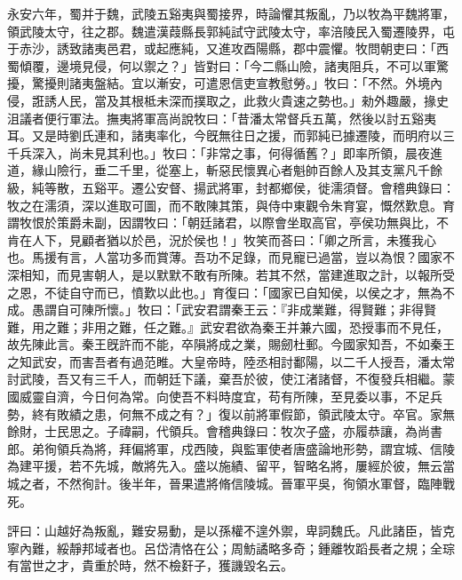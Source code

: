 \begin{pinyinscope}
永安六年，蜀并于魏，武陵五谿夷與蜀接界，時論懼其叛亂，乃以牧為平魏將軍，領武陵太守，往之郡。魏遣漢葭縣長郭純試守武陵太守，率涪陵民入蜀遷陵界，屯于赤沙，誘致諸夷邑君，或起應純，又進攻酉陽縣，郡中震懼。牧問朝吏曰：「西蜀傾覆，邊境見侵，何以禦之？」皆對曰：「今二縣山險，諸夷阻兵，不可以軍驚擾，驚擾則諸夷盤結。宜以漸安，可遣恩信吏宣教慰勞。」牧曰：「不然。外境內侵，誑誘人民，當及其根柢未深而撲取之，此救火貴速之勢也。」勑外趣嚴，掾史沮議者便行軍法。撫夷將軍高尚說牧曰：「昔潘太常督兵五萬，然後以討五谿夷耳。又是時劉氏連和，諸夷率化，今旣無往日之援，而郭純已據遷陵，而明府以三千兵深入，尚未見其利也。」牧曰：「非常之事，何得循舊？」即率所領，晨夜進道，緣山險行，垂二千里，從塞上，斬惡民懷異心者魁帥百餘人及其支黨凡千餘級，純等散，五谿平。遷公安督、揚武將軍，封都鄉侯，徙濡須督。會稽典錄曰：牧之在濡須，深以進取可圖，而不敢陳其策，與侍中東觀令朱育宴，慨然歎息。育謂牧恨於策爵未副，因謂牧曰：「朝廷諸君，以際會坐取高官，亭侯功無與比，不肯在人下，見顧者猶以於邑，況於侯也！」牧笑而荅曰：「卿之所言，未獲我心也。馬援有言，人當功多而賞薄。吾功不足錄，而見寵已過當，豈以為恨？國家不深相知，而見害朝人，是以默默不敢有所陳。若其不然，當建進取之計，以報所受之恩，不徒自守而已，憤歎以此也。」育復曰：「國家已自知侯，以侯之才，無為不成。愚謂自可陳所懷。」牧曰：「武安君謂秦王云：『非成業難，得賢難；非得賢難，用之難；非用之難，任之難。』武安君欲為秦王并兼六國，恐授事而不見任，故先陳此言。秦王旣許而不能，卒隕將成之業，賜劒杜郵。今國家知吾，不如秦王之知武安，而害吾者有過范睢。大皇帝時，陸丞相討鄱陽，以二千人授吾，潘太常討武陵，吾又有三千人，而朝廷下議，棄吾於彼，使江渚諸督，不復發兵相繼。蒙國威靈自濟，今日何為常。向使吾不料時度宜，苟有所陳，至見委以事，不足兵勢，終有敗績之患，何無不成之有？」復以前將軍假節，領武陵太守。卒官。家無餘財，士民思之。子禕嗣，代領兵。會稽典錄曰：牧次子盛，亦履恭讓，為尚書郎。弟徇領兵為將，拜偏將軍，戍西陵，與監軍使者唐盛論地形勢，謂宜城、信陵為建平援，若不先城，敵將先入。盛以施績、留平，智略名將，屢經於彼，無云當城之者，不然徇計。後半年，晉果遣將脩信陵城。晉軍平吳，徇領水軍督，臨陣戰死。

評曰：山越好為叛亂，難安易動，是以孫權不遑外禦，卑詞魏氏。凡此諸臣，皆克寧內難，綏靜邦域者也。呂岱清恪在公；周魴譎略多奇；鍾離牧蹈長者之規；全琮有當世之才，貴重於時，然不檢姧子，獲譏毀名云。


\end{pinyinscope}